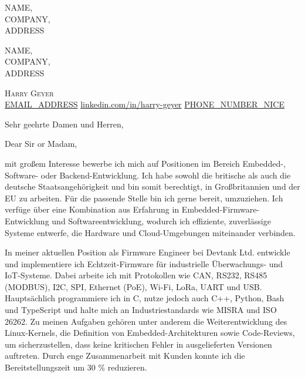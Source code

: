 \documentclass[10.5pt]{letter}
\begin{document}
\ifdefined\german
\begin{letter}{NAME,
    \\ COMPANY,
    \\ ADDRESS
}
\else
\begin{letter}{NAME,
    \\ COMPANY,
    \\ ADDRESS
}
\fi

\AddToShipoutPictureBG{
    \color{gr}
    \AtPageUpperLeft{\rule[-1.3in]{\paperwidth}{1.3in}}
}
\begin{center}{\fontsize{28}{0}\selectfont\scshape Harry Geyer} \\
    \href{mailto:EMAIL_ADDRESS}{\faEnvelope\enspace EMAIL_ADDRESS}\hfill
    \href{https://linkedin.com/in/harry-geyer}{\faLinkedinIn\enspace linkedin.com/in/harry-geyer}\hfill
    \href{tel:PHONE_NUMBER_BASIC}{\faPhone\enspace PHONE_NUMBER_NICE}\hfill \\
    \faDesktop{}\hfill
    \faGithub{} \hfill
    \faMapMarker{}\hfill
\end{center}

\ifdefined\german
\date{\germanformat{\today}}
\else
\date{\today}
\fi

\ifdefined\german
\opening{Sehr geehrte Damen und Herren,}
\else
\opening{Dear Sir or Madam,}
\fi

\vspace{-0.1in}\setlength\parindent{24pt}
\noindent

\ifdefined\german
mit großem Interesse bewerbe ich mich auf Positionen im Bereich Embedded-, Software- oder Backend-Entwicklung. Ich habe sowohl die britische als auch die deutsche Staatsangehörigkeit und bin somit berechtigt, in Großbritannien und der EU zu arbeiten. Für die passende Stelle bin ich gerne bereit, umzuziehen. Ich verfüge über eine Kombination aus Erfahrung in Embedded-Firmware-Entwicklung und Softwareentwicklung, wodurch ich effiziente, zuverlässige Systeme entwerfe, die Hardware und Cloud-Umgebungen miteinander verbinden.

In meiner aktuellen Position als Firmware Engineer bei Devtank Ltd. entwickle und implementiere ich Echtzeit-Firmware für industrielle Überwachungs- und IoT-Systeme. Dabei arbeite ich mit Protokollen wie CAN, RS232, RS485 (MODBUS), I2C, SPI, Ethernet (PoE), Wi-Fi, LoRa, UART und USB. Hauptsächlich programmiere ich in C, nutze jedoch auch C++, Python, Bash und TypeScript und halte mich an Industriestandards wie MISRA und ISO 26262. Zu meinen Aufgaben gehören unter anderem die Weiterentwicklung des Linux-Kernels, die Definition von Embedded-Architekturen sowie Code-Reviews, um sicherzustellen, dass keine kritischen Fehler in ausgelieferten Versionen auftreten. Durch enge Zusammenarbeit mit Kunden konnte ich die Bereitstellungszeit um 30 \% reduzieren.


\end{letter}
\end{letter}
\end{document}
